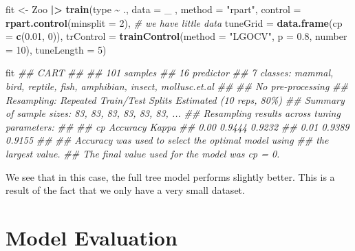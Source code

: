 \documentclass[
  notitlepage]{book}
\newenvironment{Shaded}{\begin{snugshade}}{\end{snugshade}}
\newcommand{\CommentTok}[1]{\textcolor[rgb]{0.56,0.35,0.01}{\textit{#1}}}
\newcommand{\DataTypeTok}[1]{\textcolor[rgb]{0.13,0.29,0.53}{#1}}
\newcommand{\DecValTok}[1]{\textcolor[rgb]{0.00,0.00,0.81}{#1}}
\newcommand{\ErrorTok}[1]{\textcolor[rgb]{0.64,0.00,0.00}{\textbf{#1}}}
\newcommand{\FloatTok}[1]{\textcolor[rgb]{0.00,0.00,0.81}{#1}}
\newcommand{\KeywordTok}[1]{\textcolor[rgb]{0.13,0.29,0.53}{\textbf{#1}}}
\newcommand{\NormalTok}[1]{#1}
\newcommand{\OperatorTok}[1]{\textcolor[rgb]{0.81,0.36,0.00}{\textbf{#1}}}
\newcommand{\StringTok}[1]{\textcolor[rgb]{0.31,0.60,0.02}{#1}}
\begin{document}
\begin{Shaded}
\begin{Highlighting}[]
\NormalTok{fit \textless{}{-}}\StringTok{ }\NormalTok{Zoo }\OperatorTok{|}\ErrorTok{\textgreater{}}
\StringTok{  }\KeywordTok{train}\NormalTok{(type }\OperatorTok{\textasciitilde{}}\StringTok{ }\NormalTok{.,}
    \DataTypeTok{data =}\NormalTok{ \_ ,}
    \DataTypeTok{method =} \StringTok{"rpart"}\NormalTok{,}
    \DataTypeTok{control =} \KeywordTok{rpart.control}\NormalTok{(}\DataTypeTok{minsplit =} \DecValTok{2}\NormalTok{), }\CommentTok{\# we have little data}
    \DataTypeTok{tuneGrid =} \KeywordTok{data.frame}\NormalTok{(}\DataTypeTok{cp =} \KeywordTok{c}\NormalTok{(}\FloatTok{0.01}\NormalTok{, }\DecValTok{0}\NormalTok{)),}
    \DataTypeTok{trControl =} \KeywordTok{trainControl}\NormalTok{(}\DataTypeTok{method =} \StringTok{"LGOCV"}\NormalTok{, }
                             \DataTypeTok{p =} \FloatTok{0.8}\NormalTok{, }
                             \DataTypeTok{number =} \DecValTok{10}\NormalTok{),}
    \DataTypeTok{tuneLength =} \DecValTok{5}\NormalTok{)}

\NormalTok{fit}
\CommentTok{\#\# CART }
\CommentTok{\#\# }
\CommentTok{\#\# 101 samples}
\CommentTok{\#\#  16 predictor}
\CommentTok{\#\#   7 classes: \textquotesingle{}mammal\textquotesingle{}, \textquotesingle{}bird\textquotesingle{}, \textquotesingle{}reptile\textquotesingle{}, \textquotesingle{}fish\textquotesingle{}, \textquotesingle{}amphibian\textquotesingle{}, \textquotesingle{}insect\textquotesingle{}, \textquotesingle{}mollusc.et.al\textquotesingle{} }
\CommentTok{\#\# }
\CommentTok{\#\# No pre{-}processing}
\CommentTok{\#\# Resampling: Repeated Train/Test Splits Estimated (10 reps, 80\%) }
\CommentTok{\#\# Summary of sample sizes: 83, 83, 83, 83, 83, 83, ... }
\CommentTok{\#\# Resampling results across tuning parameters:}
\CommentTok{\#\# }
\CommentTok{\#\#   cp    Accuracy  Kappa }
\CommentTok{\#\#   0.00  0.9444    0.9232}
\CommentTok{\#\#   0.01  0.9389    0.9155}
\CommentTok{\#\# }
\CommentTok{\#\# Accuracy was used to select the optimal model using}
\CommentTok{\#\#  the largest value.}
\CommentTok{\#\# The final value used for the model was cp = 0.}
\end{Highlighting}
\end{Shaded}

We see that in this case, the full tree model performs slightly better.
This is a result of the fact that we only have a very small dataset.

\hypertarget{model-evaluation}{%
\section{Model Evaluation}\label{model-evaluation}}
\end{document}
